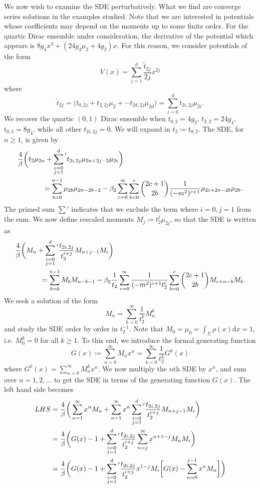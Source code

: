 \documentclass[10pt]{article}
\newcommand{\dif}{\mathrm{d}}
\theoremstyle{plain}
\theoremstyle{definition}
\theoremstyle{plain}
\begin{document}
We now wish to examine the SDE perturbatively. What we find are converge series solutions in the examples studied. Note that we are interested in potentials whose coefficients may depend on the moments up to some finite order. For the quartic Dirac ensemble under consideration, the derivative of the potential which appears is $8g_4x^3 + (24g_4 \mu_2 +4g_2)x$. For this reason, we consider potentials of the form 
\[ V(x)=\sum_{j=1}^{d} \frac{\widetilde{t}_{2j}}{2j}x^{2j} \]
where 
\[ \widetilde{t}_{2j} = \bigg( t_{0,2j} + t_{2,2j}\mu_2 + \cdots t_{2d,2j}\mu_{2d}\bigg)  = \sum_{i=0}^{d} t_{2i,2j}\mu_{2i}. \]
We recover the quartic $(0,1)$ Dirac ensemble when $t_{0,2}=4g_2$, $t_{2,2}=24g_4$, $t_{0,4}=8g_4$, while all other $t_{2i,2j}=0$. We will expand in $t_2 \coloneqq t_{0,2}$. The SDE, for $n\geq 1$, is given by
\begin{align*}
	\frac{4}{\beta}\bigg(&t_2\mu_{2n}+\sum_{\substack{i=0\\ j=1}}^{d}{\vphantom{\sum}}'t_{2i,2j} \mu_{2n+2j-2}\mu_{2i}\bigg)\\&\qquad=  \sum_{b=0}^{n-1} \mu_{2b}\mu_{2n-2b-2}  - \beta_2\sum_{c=0}^\infty\sum_{b=0}^{c}{2c+1\choose 2b}\frac{1}{(-m^2)^{c+1}} \mu_{2c+2n-2b}\mu_{2b}. 
\end{align*}
The primed sum $\sum'$ indicates that we exclude the term where $i=0,j=1$ from the sum. We now define rescaled moments $M_j \coloneqq t_2^j \mu_{2j}$, so that the SDE is written as
\begin{align*}
	\frac{4}{\beta}\bigg(&M_n+\sum_{\substack{i=0\\ j=1}}^{d}{\vphantom{\sum}}' \frac{t_{2i,2j}}{t_2^{i+j}} M_{n+j-1}M_{i}\bigg)\\&\qquad=  \sum_{b=0}^{n-1}M_{b}M_{n-b-1}  - \beta_2\frac{1}{t_2}\sum_{c=0}^\infty\frac{1}{(-m^2)^{c+1}t_2^c}\sum_{b=0}^{c}{2c+1\choose 2b}  M_{c+n-b}M_{b} .
\end{align*}
We seek a solution of the form
\[ M_n = \sum_{k=0}^\infty \frac{1}{t_2^k}M_n^k \]
and study the SDE order by order in $t_2^{-1}$. Note that $M_0 = \mu_0 = \int_\Sigma \rho(x)\dif x = 1$, i.e. $M_0^k = 0$ for all $k\geq 1$. To this end, we introduce the formal generating function
\[ G(x) \coloneqq \sum_{n=0}^\infty M_n x^n = \sum_{k=0}^\infty \frac{1}{t_2^k} G^k(x) \]
where $G^k(x) = \sum_{n=0}^\infty M_n^k x^n$. We now multiply the $n$th SDE by $x^n$, and sum over $n=1,2,\dots$ to get the SDE in terms of the generating function $G(x)$. The left hand side becomes
\begin{align*}
	LHS &= \frac{4}{\beta}\bigg(\sum_{n=1}^\infty x^nM_n + \sum_{n=1}^\infty x^n\sum_{\substack{i=0\\ j=1}}^{d}{\vphantom{\sum}}' \frac{t_{2i,2j}}{t_2^{i+j}}M_{n+j-1}M_i \bigg)\\ &= \frac{4}{\beta}\bigg( G(x)-1 + \sum_{\substack{i=0\\ j=1}}^{d}{\vphantom{\sum}}' \frac{t_{2i,2j}}{t_2^{i+j}}\sum_{n=j}^\infty x^{n+1-j}M_n M_i\bigg) \\
	&= \frac{4}{\beta}\bigg( G(x)-1 + \sum_{\substack{i=0\\ j=1}}^{d}{\vphantom{\sum}}' \frac{t_{2i,2j}}{t_2^{i+j}}x^{1-j}M_i \bigg[ G(x) - \sum_{n=0}^{j-1} x^nM_n \bigg]\bigg)
\end{align*}
\end{document}
